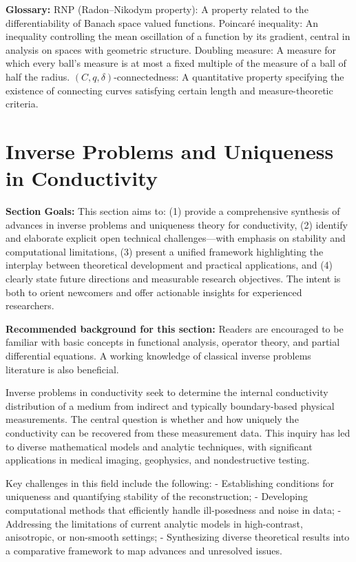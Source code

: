 \documentclass[sigconf]{acmart}
\begin{document}
\textbf{Glossary:}
RNP (Radon–Nikodym property): A property related to the differentiability of Banach space valued functions.
Poincaré inequality: An inequality controlling the mean oscillation of a function by its gradient, central in analysis on spaces with geometric structure.
Doubling measure: A measure for which every ball's measure is at most a fixed multiple of the measure of a ball of half the radius.
$(C, q, \delta)$-connectedness: A quantitative property specifying the existence of connecting curves satisfying certain length and measure-theoretic criteria.

\section{Inverse Problems and Uniqueness in Conductivity}

\textbf{Section Goals:} This section aims to: (1) provide a comprehensive synthesis of advances in inverse problems and uniqueness theory for conductivity, (2) identify and elaborate explicit open technical challenges---with emphasis on stability and computational limitations, (3) present a unified framework highlighting the interplay between theoretical development and practical applications, and (4) clearly state future directions and measurable research objectives. The intent is both to orient newcomers and offer actionable insights for experienced researchers.

\textbf{Recommended background for this section:} Readers are encouraged to be familiar with basic concepts in functional analysis, operator theory, and partial differential equations. A working knowledge of classical inverse problems literature is also beneficial.

Inverse problems in conductivity seek to determine the internal conductivity distribution of a medium from indirect and typically boundary-based physical measurements. The central question is whether and how uniquely the conductivity can be recovered from these measurement data. This inquiry has led to diverse mathematical models and analytic techniques, with significant applications in medical imaging, geophysics, and nondestructive testing.

Key challenges in this field include the following:
- Establishing conditions for uniqueness and quantifying stability of the reconstruction;
- Developing computational methods that efficiently handle ill-posedness and noise in data;
- Addressing the limitations of current analytic models in high-contrast, anisotropic, or non-smooth settings;
- Synthesizing diverse theoretical results into a comparative framework to map advances and unresolved issues.
\end{document}
